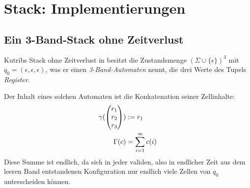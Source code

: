 \documentclass{article}
\begin{document}
\section{Stack: Implementierungen}

\subsection{Ein 3-Band-Stack ohne Zeitverlust}

Kutribs Stack ohne Zeitverlust in \cite{kutrib08} besitzt die Zustandsmenge $(\Sigma \cup \{\epsilon\})^3$ mit $q_0 = (\epsilon,\epsilon,\epsilon)$, was er einen \emph{3-Band-Automaten} nennt, die drei Werte des Tupels \emph{Register}.

Der Inhalt eines solchen Automaten ist die Konkatenation seiner Zellinhalte:
\begin{align*}
    \gamma(\begin{pmatrix}r_1\\r_2\\r_3\end{pmatrix}) &:= r_1 \\
\Gamma(c) &= \sum^\infty_{i=1} c(i)
\end{align*}
Diese Summe ist endlich, da sich in jeder validen, also in endlicher Zeit aus dem leeren Band entstandenen Konfiguration nur endlich viele Zellen von $q_0$ unterscheiden können.
\end{document}
